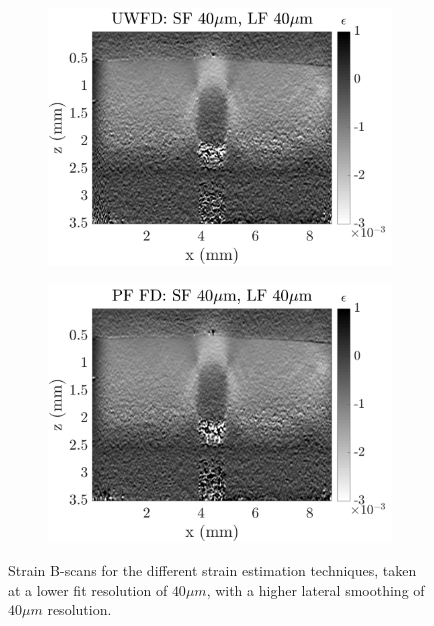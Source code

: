 \begin{figure}[h]
\begin{subfigure}{0.49\textwidth}
        \includegraphics[width=\textwidth]{appendix_figs/uwfd_fr40_lr40.png}
    \end{subfigure}
    \begin{subfigure}{0.49\textwidth}
    	\centering
        \includegraphics[width=\textwidth]{appendix_figs/pffd_fr40_lr40.png}
    \end{subfigure}    
    \caption{Strain B-scans for the different strain estimation techniques, taken at a lower fit resolution of $40\mu m$, with a higher lateral smoothing of $40 \mu m$ resolution.}
	\label{fr40_lr40}
\end{figure}

